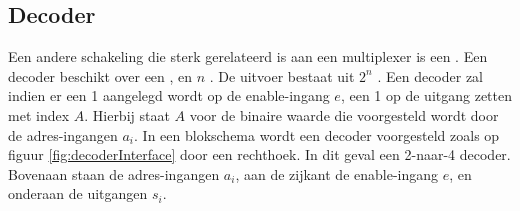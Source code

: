 \subsection{Decoder}
\label{ss:decoder}
Een andere schakeling die sterk gerelateerd is aan een multiplexer is een . Een decoder beschikt over een , en $n$ . De uitvoer bestaat uit $2^n$ . Een decoder zal indien er een 1 aangelegd wordt op de enable-ingang $e$, een 1 op de uitgang zetten met index $A$. Hierbij staat $A$ voor de binaire waarde die voorgesteld wordt door de adres-ingangen $a_i$. In een blokschema wordt een decoder voorgesteld zoals op figuur \ref{fig:decoderInterface} door een rechthoek. In dit geval een 2-naar-4 decoder. Bovenaan staan de adres-ingangen $a_i$, aan de zijkant de enable-ingang $e$, en onderaan de uitgangen $s_i$.
